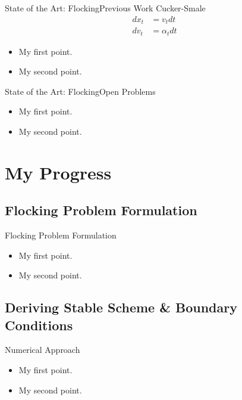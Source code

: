\documentclass{beamer}
\begin{document}
\begin{frame}{State of the Art: Flocking}{Previous Work}
	Cucker-Smale
	\begin{equation}
				\begin{split}
				dx_t&=v_tdt\\
				dv_t&=\alpha_t dt %
				\end{split}
	\end{equation}
	\begin{itemize}
		\item {
			My first point.
		}
		\item {
			My second point.
		}
	\end{itemize}
\end{frame}

\begin{frame}{State of the Art: Flocking}{Open Problems}
	\begin{itemize}
		\item {
			My first point.
		}
		\item {
			My second point.
		}
	\end{itemize}
\end{frame}

\section{My Progress}

\subsection{Flocking Problem Formulation}

\begin{frame}{Flocking Problem Formulation}
	\begin{itemize}
		\item {
			My first point.
		}
		\item {
			My second point.
		}
	\end{itemize}
\end{frame}

\subsection{Deriving Stable Scheme \& Boundary Conditions}

\begin{frame}{Numerical Approach}
	\begin{itemize}
		\item {
			My first point.
		}
		\item {
			My second point.
		}
	\end{itemize}
\end{frame}
\end{document}
